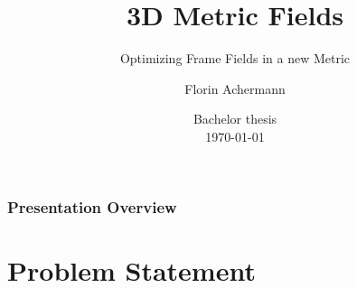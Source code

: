 \documentclass[
	11pt, %
	aspectratio=169, %
]{beamer}
\title[3D Metric Fields]{3D Metric Fields} %
\subtitle{Optimizing Frame Fields in a new Metric} %
\author[Florin Achermann]{Florin Achermann} %
\institute[Unibe]{University of Berne } %
\date[\today]{Bachelor thesis \\ \today} %
\begin{document}

\begin{frame}
	\titlepage %
\end{frame}



\begin{frame}
	\frametitle{Presentation Overview} %
	
	\tableofcontents %
\end{frame}


\section{Problem Statement} %
\end{document}

